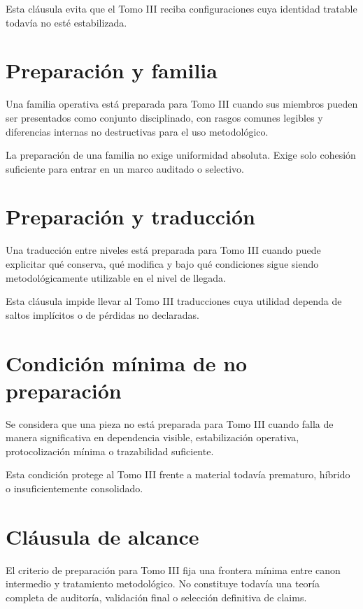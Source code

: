 \begin{observation}
Esta cláusula evita que el Tomo III reciba configuraciones cuya identidad tratable todavía no esté estabilizada.
\end{observation}

\section{Preparación y familia}
\begin{definition}
Una familia operativa está preparada para Tomo III cuando sus miembros pueden ser presentados como conjunto disciplinado, con rasgos comunes legibles y diferencias internas no destructivas para el uso metodológico.
\end{definition}

\begin{observation}
La preparación de una familia no exige uniformidad absoluta. Exige solo cohesión suficiente para entrar en un marco auditado o selectivo.
\end{observation}

\section{Preparación y traducción}
\begin{definition}
Una traducción entre niveles está preparada para Tomo III cuando puede explicitar qué conserva, qué modifica y bajo qué condiciones sigue siendo metodológicamente utilizable en el nivel de llegada.
\end{definition}

\begin{observation}
Esta cláusula impide llevar al Tomo III traducciones cuya utilidad dependa de saltos implícitos o de pérdidas no declaradas.
\end{observation}

\section{Condición mínima de no preparación}
\begin{definition}
Se considera que una pieza no está preparada para Tomo III cuando falla de manera significativa en dependencia visible, estabilización operativa, protocolización mínima o trazabilidad suficiente.
\end{definition}

\begin{observation}
Esta condición protege al Tomo III frente a material todavía prematuro, híbrido o insuficientemente consolidado.
\end{observation}

\section{Cláusula de alcance}
\begin{observation}
El criterio de preparación para Tomo III fija una frontera mínima entre canon intermedio y tratamiento metodológico. No constituye todavía una teoría completa de auditoría, validación final o selección definitiva de claims.
\end{observation}

